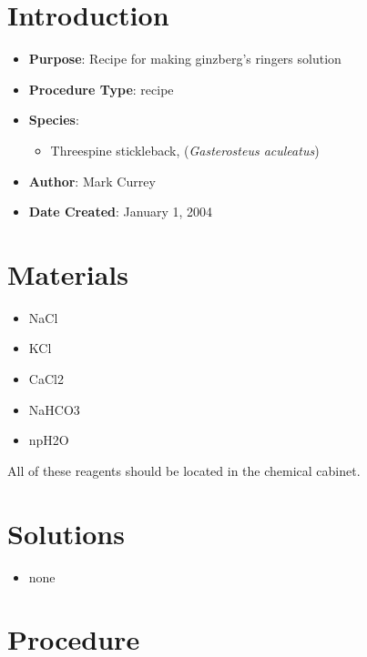 \documentclass[
  letterpaper,
  DIV=11,
  numbers=noendperiod]{scrreprt}
\providecommand{\tightlist}{%
  \setlength{\itemsep}{0pt}\setlength{\parskip}{0pt}}\usepackage{longtable,booktabs,array}
\begin{document}
\hypertarget{introduction-94}{%
\section{Introduction}\label{introduction-94}}

\begin{itemize}
\tightlist
\item
  \textbf{Purpose}: Recipe for making ginzberg's ringers solution\\
\item
  \textbf{Procedure Type}: recipe
\item
  \textbf{Species}:

  \begin{itemize}
  \tightlist
  \item
    Threespine stickleback, (\emph{Gasterosteus aculeatus})
  \end{itemize}
\item
  \textbf{Author}: Mark Currey
\item
  \textbf{Date Created}: January 1, 2004
\end{itemize}

\hypertarget{materials-89}{%
\section{Materials}\label{materials-89}}

\begin{itemize}
\tightlist
\item
  NaCl
\item
  KCl
\item
  CaCl2
\item
  NaHCO3
\item
  npH2O
\end{itemize}

All of these reagents should be located in the chemical cabinet.

\hypertarget{solutions-80}{%
\section{Solutions}\label{solutions-80}}

\begin{itemize}
\tightlist
\item
  none
\end{itemize}

\hypertarget{procedure-88}{%
\section{Procedure}\label{procedure-88}}
\end{document}
